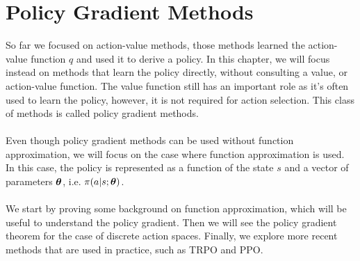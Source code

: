 \chapter{Policy Gradient Methods}
So far we focused on action-value methods, those methods learned the action-value function $q$ and used it to derive a policy. In this chapter, we will focus instead on methods that learn the policy directly, without consulting a value, or action-value function. The value function still has an important role as it's often used to learn the policy, however, it is not required for action selection. This class of methods is called policy gradient methods.\\\\
Even though policy gradient methods can be used without function approximation, we will focus on the case where function approximation is used. In this case, the policy is represented as a function of the state $s$ and a vector of parameters $\boldsymbol{\theta}$, i.e. $\pi(a|s; \boldsymbol{\theta})$.\\\\
We start by proving some background on function approximation, which will be useful to understand the policy gradient. Then we will see the policy gradient theorem for the case of discrete action spaces. Finally, we explore more recent methods that are used in practice, such as TRPO and PPO.\\\\

